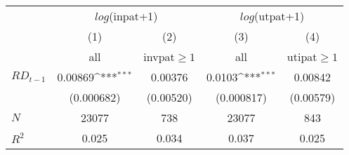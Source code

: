 {
\def\sym#1{\ifmmode^{#1}\else\(^{#1}\)\fi}
\begin{tabular}{l*{4}{c}}
\hline\hline
  &\multicolumn{2}{c}{$log$(inpat+1)}&\multicolumn{2}{c}{$log$(utpat+1)}\\\cmidrule{2-5}
            &\multicolumn{1}{c}{(1)}&\multicolumn{1}{c}{(2)}&\multicolumn{1}{c}{(3)}&\multicolumn{1}{c}{(4)}\\
            &\multicolumn{1}{c}{all}&\multicolumn{1}{c}{invpat$\geq 1$}&\multicolumn{1}{c}{all}&\multicolumn{1}{c}{utipat$\geq 1$}\\
\hline
$RD_{t-1}$        &     0.00869\sym{***}&     0.00376         &      0.0103\sym{***}&     0.00842         \\
            &  (0.000682)         &   (0.00520)         &  (0.000817)         &   (0.00579)         \\
\hline
\(N\)       &       23077         &         738         &       23077         &         843         \\
\(R^{2}\)   &       0.025         &       0.034         &       0.037         &       0.025         \\
\hline\hline
\end{tabular}
}
